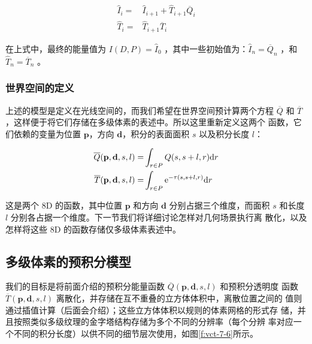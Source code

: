 \begin{equation}
	\begin{aligned}
		\hat{I}_i=& \hat{I}_{i+1}+\hat {T}_{i+1}\overline{Q}_i\\
		\hat{T}_i=&\hat{T}_{i+1}\overline{T}_i
	\end{aligned}
\end{equation}

\noindent 在上式中，最终的能量值为 $I(D,P) = \hat{I}_0$ ，其中一些初始值为：$\hat{I}_n = \overline{Q}_n$ ，和 $\hat{T}_n = \overline{T}_n$ 。



\subsubsection{世界空间的定义}
上述的模型是定义在光线空间的，而我们希望在世界空间预计算两个方程 $\overline{Q}$ 和 $\overline{T}$，这样便于将它们存储在多级体素的表述中。所以这里重新定义这两个 函数，它们依赖的变量为位置 $\mathbf{p}$，方向 $\mathbf{d}$，积分的表面面积 $s$ 以及积分长度 $l$：

\begin{equation}
\begin{aligned}
	\overline{Q}(\mathbf{p},\mathbf{d},s,l)=&\int_{r\in P}Q(s,s+l,r){\rm d}r\\
	\overline{T}(\mathbf{p},\mathbf{d},s,l)=&\int_{r\in P}{\rm e}^{-\tau (s,s+l,r)}{\rm d}r
\end{aligned}
\end{equation}

这是两个 8D 的函数，其中位置 $\mathbf{p}$ 和方向 $\mathbf{d}$ 分别占据三个维度，而面积 $s$ 和长度 $l$ 分别各占据一个维度。下一节我们将详细讨论怎样对几何场景执行离 散化，以及怎样将这些 8D 的函数存储仅多级体素表述中。



\subsection{多级体素的预积分模型}\label{sec:vct-mip-pre-intergation}
我们的目标是将前面介绍的预积分能量函数 $\overline{Q}(\mathbf{p},\mathbf{d},s,l)$ 和预积分透明度 函数 $\overline{T}(\mathbf{p},\mathbf{d},s,l)$ 离散化，并存储在互不重叠的立方体体积中，离散位置之间的 值则通过插值计算（后面会介绍）；这些立方体体积以规则的体素网格的形式存 储，并且按照类似多级纹理的金字塔结构存储为多个不同的分辨率（每个分辨 率对应一个不同的积分长度）以供不同的细节层次使用，如图\ref{f:vct-7-6}所示。

